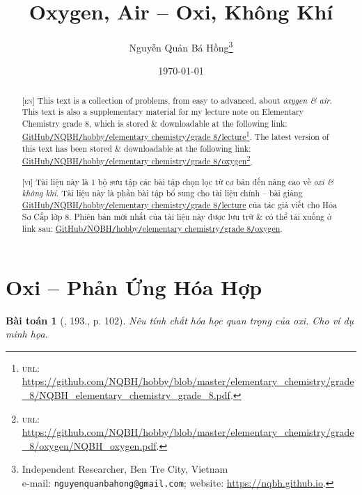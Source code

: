 \documentclass{article}
\title{Oxygen, Air -- Oxi, Không Khí}
\author{Nguyễn Quản Bá Hồng\footnote{Independent Researcher, Ben Tre City, Vietnam\\e-mail: \texttt{nguyenquanbahong@gmail.com}; website: \url{https://nqbh.github.io}.}}
\date{\today}
\newtheorem{baitoan}{Bài toán}
\begin{document}
\maketitle
\begin{abstract}
	\textsc{[en]} This text is a collection of problems, from easy to advanced, about \textit{oxygen \& air}. This text is also a supplementary material for my lecture note on Elementary Chemistry grade 8, which is stored \& downloadable at the following link: \href{https://github.com/NQBH/hobby/blob/master/elementary_chemistry/grade_8/NQBH_elementary_chemistry_grade_8.pdf}{GitHub\texttt{/}NQBH\texttt{/}hobby\texttt{/}elementary chemistry\texttt{/}grade 8\texttt{/}lecture}\footnote{\textsc{url}: \url{https://github.com/NQBH/hobby/blob/master/elementary_chemistry/grade_8/NQBH_elementary_chemistry_grade_8.pdf}.}. The latest version of this text has been stored \& downloadable at the following link: \href{https://github.com/NQBH/hobby/blob/master/elementary_chemistry/grade_8/oxygen/NQBH_oxygen.pdf}{GitHub\texttt{/}NQBH\texttt{/}hobby\texttt{/}elementary chemistry\texttt{/}grade 8\texttt{/}oxygen}\footnote{\textsc{url}: \url{https://github.com/NQBH/hobby/blob/master/elementary_chemistry/grade_8/oxygen/NQBH_oxygen.pdf}.}.
	\vspace{2mm}
	
	\textsc{[vi]} Tài liệu này là 1 bộ sưu tập các bài tập chọn lọc từ cơ bản đến nâng cao về \textit{oxi \& không khí}. Tài liệu này là phần bài tập bổ sung cho tài liệu chính -- bài giảng \href{https://github.com/NQBH/hobby/blob/master/elementary_chemistry/grade_8/NQBH_elementary_chemistry_grade_8.pdf}{GitHub\texttt{/}NQBH\texttt{/}hobby\texttt{/}elementary chemistry\texttt{/}grade 8\texttt{/}lecture} của tác giả viết cho Hóa Sơ Cấp lớp 8. Phiên bản mới nhất của tài liệu này được lưu trữ \& có thể tải xuống ở link sau: \href{https://github.com/NQBH/hobby/blob/master/elementary_chemistry/grade_8/oxygen/NQBH_oxygen.pdf}{GitHub\texttt{/}NQBH\texttt{/}hobby\texttt{/}elementary chemistry\texttt{/}grade 8\texttt{/}oxygen}.
\end{abstract}
\tableofcontents
\newpage


\section{Oxi -- Phản Ứng Hóa Hợp}

\begin{baitoan}[\cite{An_400_BT_Hoa_Hoc_8_2020}, 193., p. 102]
	Nêu tính chất hóa học quan trọng của oxi. Cho ví dụ minh họa.
\end{baitoan}
\end{document}

